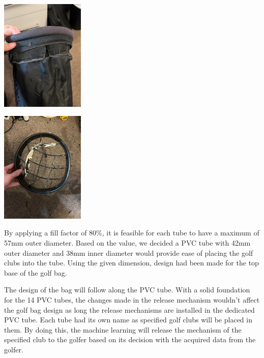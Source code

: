 \documentclass[11pt,landscape]{article}
\newenvironment{Figure}
  {\par\medskip\noindent\minipage{\linewidth}}
  {\endminipage\par\medskip}
\begin{document}
\begin{multicols}{3}
    \begin{Figure}
        \begin{center}
            \includegraphics[width=0.3\textwidth]{Figure3.jpg}
            \label{fig:cloth}
        \end{center}
    \end{Figure}
    
    \begin{Figure}
        \begin{center}
            \includegraphics[width=0.3\textwidth]{Figure2.jpg}
            \label{fig:top}
        \end{center}
    \end{Figure}
    
    
    By applying a fill factor of 80\%, it is feasible for each tube to have a
    maximum of 57mm outer diameter. Based on the value, we decided a PVC tube
    with 42mm outer diameter and 38mm inner diameter would provide ease of
    placing the golf clubs into the tube. Using the given dimension, design had
    been made for the top base of the golf bag.
    
    The design of the bag will follow along the PVC tube. With a solid
    foundation for the 14 PVC tubes, the changes made in the release mechanism
    wouldn’t affect the golf bag design as long the release mechanisms are
    installed in the dedicated PVC tube. Each tube had its own name as specified
    golf clubs will be placed in them. By doing this, the machine learning will
    release the mechanism of the specified club to the golfer based on its
    decision with the acquired data from the golfer. 
    

\end{multicols}
\end{document}
